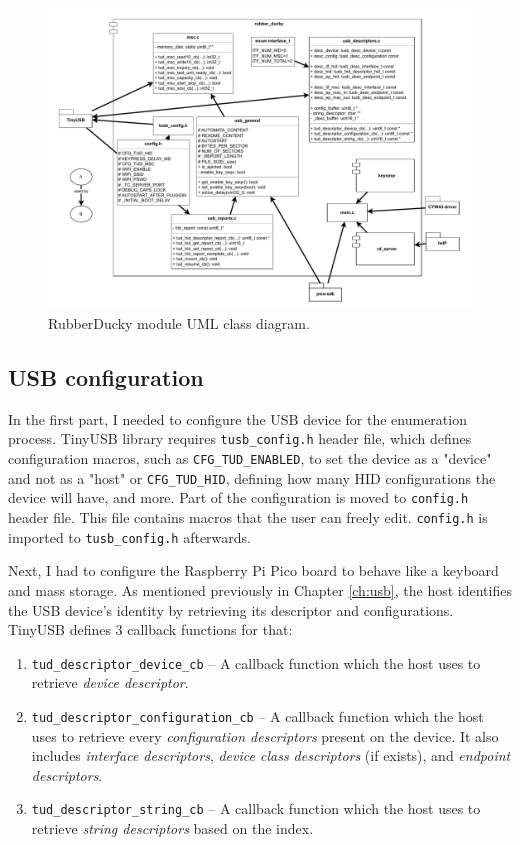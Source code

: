 \begin{figure}[ht]
    \includegraphics[width=\linewidth]{./obrazky-figures/rubber_ducky_module.pdf}
    \caption{RubberDucky module UML class diagram.}
    \label{fig:rubber_ducky_module}
\end{figure}

\subsection{USB configuration}
In the first part, I needed to configure the USB device for the enumeration process. TinyUSB library requires \verb|tusb_config.h| header file, which defines configuration macros, such as \verb|CFG_TUD_ENABLED|, to set the device as a "device" and not as a "host" or \verb|CFG_TUD_HID|, defining how many HID configurations the device will have, and more. Part of the configuration is moved to \verb|config.h| header file. This file contains macros that the user can freely edit. \verb|config.h| is imported to \verb|tusb_config.h| afterwards.

Next, I had to configure the Raspberry Pi Pico board to behave like a keyboard and mass storage. As mentioned previously in Chapter \ref{ch:usb}, the host identifies the USB device's identity by retrieving its descriptor and configurations. TinyUSB defines 3 callback functions for that:
\begin{enumerate}
    \item \verb|tud_descriptor_device_cb| -- A callback function which the host uses to retrieve \emph{device descriptor}.
    \item \verb|tud_descriptor_configuration_cb| -- A callback function which the host uses to retrieve every \emph{configuration descriptors} present on the device. It also includes \emph{interface descriptors}, \emph{device class descriptors} (if exists), and \emph{endpoint descriptors}.
    \item \verb|tud_descriptor_string_cb| -- A callback function which the host uses to retrieve \emph{string descriptors} based on the index.
\end{enumerate}

